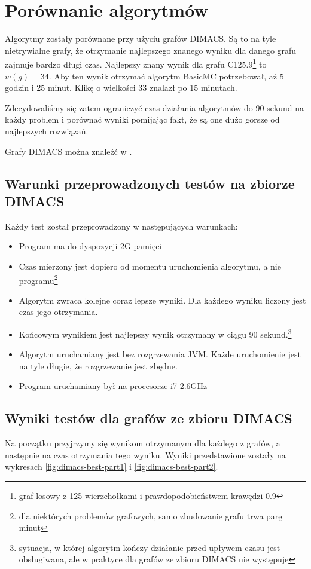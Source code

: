 \documentclass[12pt, a4paper]{article}
\begin{document}
\section{Porównanie algorytmów}
Algorytmy zostały porównane przy użyciu grafów DIMACS\citep{dimacs}. Są to na tyle nietrywialne grafy, że otrzymanie najlepszego znanego wyniku dla danego grafu zajmuje bardzo długi czas. Najlepszy znany wynik dla grafu C125.9\footnote{graf losowy z 125 wierzchołkami i prawdopodobieństwem krawędzi 0.9}  to $w(g)=34$. Aby ten wynik otrzymać algorytm BasicMC potrzebował, aż 5 godzin i 25 minut. Klikę o wielkości 33 znalazł po 15 minutach.

Zdecydowaliśmy się zatem ograniczyć czas działania algorytmów do 90 sekund na każdy problem i porównać wyniki pomijając fakt, że są one dużo gorsze od najlepszych rozwiązań.

Grafy DIMACS można znaleźć w \cite{dimacs}.

\subsection{Warunki przeprowadzonych testów na zbiorze DIMACS}
Każdy test został przeprowadzony w następujących warunkach:

\begin{itemize}
\item Program ma do dyspozycji 2G pamięci
\item Czas mierzony jest dopiero od momentu uruchomienia algorytmu, a nie programu\footnote{dla niektórych problemów grafowych, samo zbudowanie grafu trwa parę minut}
\item Algorytm zwraca kolejne coraz lepsze wyniki. Dla każdego wyniku liczony jest czas jego otrzymania.
\item Końcowym wynikiem jest najlepszy wynik otrzymany w ciągu 90 sekund.\footnote{sytuacja, w której algorytm kończy działanie przed upływem czasu jest obsługiwana, ale w praktyce dla grafów ze zbioru DIMACS nie występuje}
\item Algorytm uruchamiany jest bez rozgrzewania JVM. Każde uruchomienie jest na tyle długie, że rozgrzewanie jest zbędne.
\item Program uruchamiany był na procesorze i7 2.6GHz
\end{itemize}

\subsection{Wyniki testów dla grafów ze zbioru DIMACS}
Na początku przyjrzymy się wynikom otrzymanym dla każdego z grafów, a następnie na czas otrzymania tego wyniku. Wyniki przedstawione zostały na wykresach \ref{fig:dimacs-best-part1} i \ref{fig:dimacs-best-part2}. 
\end{document}
